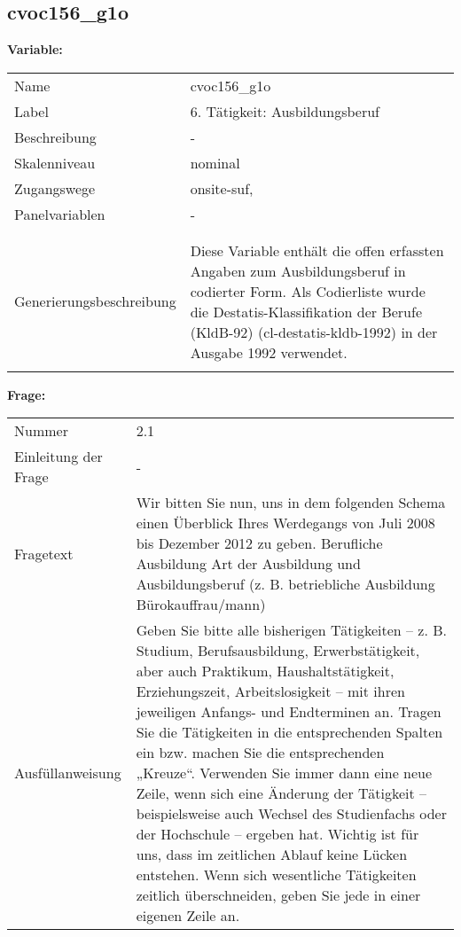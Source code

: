 	
	
	\subsection{cvoc156\_g1o}
	\label{subSection:cvoc156_g1o}

	\noindent\textbf{Variable:}\\
		\begin{tabular}{lL{11.3cm}}
			\label{tableVariable:cvoc156_g1o}
			Name & cvoc156\_g1o \\
			Label & 6. Tätigkeit: Ausbildungsberuf \\
			Beschreibung & - \\
			Skalenniveau & nominal \\
			Zugangswege &
				onsite-suf,
 \\
			Panelvariablen & -
			 \\
			 \\
 \\
					Generierungsbeschreibung & Diese Variable enthält die offen erfassten Angaben zum Ausbildungsberuf in codierter Form. Als Codierliste wurde die Destatis-Klassifikation der Berufe (KldB-92) (cl-destatis-kldb-1992) in der Ausgabe 1992 verwendet. 
				 \\	
			 \\
		\end{tabular}

		\vspace*{1 cm}
		\noindent\textbf{Frage:}\\
		\begin{tabular}{lL{11.3cm}}
			\label{tableQuestion:cvoc156_g1o}
			Nummer & 2.1 \\
			Einleitung der Frage & - \\
			Fragetext & Wir bitten Sie nun, uns in dem folgenden Schema einen Überblick Ihres Werdegangs von Juli 2008 bis Dezember 2012 zu geben.
Berufliche Ausbildung
Art der Ausbildung und Ausbildungsberuf
(z. B. betriebliche Ausbildung Bürokauffrau/mann) \\
			Ausfüllanweisung & Geben Sie bitte alle bisherigen Tätigkeiten – z. B. Studium, Berufsausbildung, Erwerbstätigkeit, aber auch Praktikum, Haushaltstätigkeit,
Erziehungszeit, Arbeitslosigkeit – mit ihren jeweiligen Anfangs- und Endterminen an. Tragen Sie die Tätigkeiten in die entsprechenden Spalten ein bzw. machen Sie die entsprechenden „Kreuze“. Verwenden Sie immer dann eine neue Zeile, wenn sich eine Änderung der Tätigkeit – beispielsweise auch Wechsel des Studienfachs oder der Hochschule – ergeben hat. Wichtig ist für uns, dass im zeitlichen Ablauf keine Lücken entstehen. Wenn sich wesentliche Tätigkeiten zeitlich überschneiden, geben Sie jede in einer eigenen Zeile an. \\
		\end{tabular}





